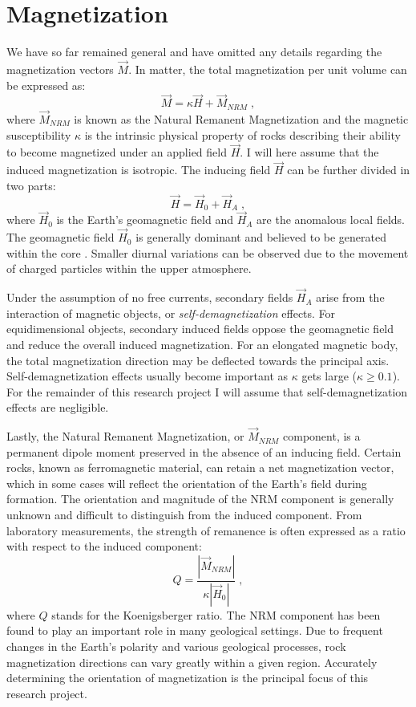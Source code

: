 \section{Magnetization}
We have so far remained general and have omitted any details regarding the magnetization vectors $\vec M$. In matter, the total magnetization per unit volume can be expressed as:
 \begin{equation}\label{Magnetization}
	\vec M = \kappa \vec H + \vec M_{NRM}\;,
\end{equation}
where $\vec M_{NRM}$ is known as the Natural Remanent Magnetization and the magnetic susceptibility $\kappa$ is the intrinsic physical property of rocks describing their ability to become magnetized under an applied field $\vec H$.
I will here assume that the induced magnetization is isotropic.
The inducing field $\vec H$ can be further divided in two parts:
 \begin{equation}\label{M_induced}
 	\vec H = \vec {{H}}_0 + \vec {{H}}_{A} \; , 
\end{equation}
where $\vec {{H}}_0$ is the Earth's geomagnetic field and $\vec {{H}}_{A}$ are the anomalous local fields.
The geomagnetic field $\vec {{H}}_0$ is generally dominant and believed to be generated within the core \cite{Campbell1997}.
Smaller diurnal variations can be observed due to the movement of charged particles within the upper atmosphere.

Under the assumption of no free currents, secondary fields $\vec {{H}}_A$ arise from the interaction of magnetic objects, or \emph{self-demagnetization} effects. 
For equidimensional objects, secondary induced fields oppose the geomagnetic field and reduce the overall induced magnetization. For an elongated magnetic body, the total magnetization direction may be deflected towards the principal axis. 
Self-demagnetization effects usually become important as $\kappa$ gets large ($\kappa \geq 0.1$). 
For the remainder of this research project I will assume that self-demagnetization effects are negligible.

Lastly, the Natural Remanent Magnetization, or $\vec M_{NRM}$ component, is a permanent dipole moment preserved in the absence of an inducing field. 
Certain rocks, known as ferromagnetic material, can retain a net magnetization vector, which in some cases will reflect the orientation of the Earth's field during formation.
The orientation and magnitude of the NRM component is generally unknown and difficult to distinguish from the induced component.
From laboratory measurements, the strength of remanence is often expressed as a ratio with respect to the induced component:
\begin{equation}\label{Koenigsber}
Q = \frac{|\vec M_{NRM}|}{\kappa |\vec H_0|}\;,
\end{equation}
where $Q$ stands for the Koenigsberger ratio. 
The NRM component has been found to play an important role in many geological settings.
Due to frequent changes in the Earth's polarity and various geological processes, rock magnetization directions can vary greatly within a given region.
Accurately determining the orientation of magnetization is the principal focus of this research project.

